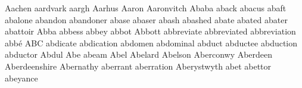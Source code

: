 Aachen aardvark aargh Aarhus Aaron Aaronvitch Ababa aback abacus abaft abalone abandon abandoner abase abaser abash abashed abate abated abater abattoir Abba abbess abbey abbot Abbott abbreviate abbreviated abbreviation abbé ABC abdicate abdication abdomen abdominal abduct abductee abduction abductor Abdul Abe abeam Abel Abelard Abelson Aberconwy Aberdeen Aberdeenshire Abernathy aberrant aberration Aberystwyth abet abettor abeyance 